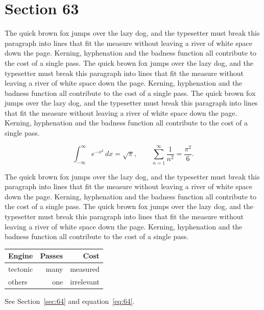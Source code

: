 \documentclass{article}
\begin{document}
\section{Section 63}
\label{sec:63}
The quick brown fox jumps over the lazy dog, and the typesetter must break this paragraph into lines that fit the measure without leaving a river of white space down the page. Kerning, hyphenation and the badness function all contribute to the cost of a single pass. The quick brown fox jumps over the lazy dog, and the typesetter must break this paragraph into lines that fit the measure without leaving a river of white space down the page. Kerning, hyphenation and the badness function all contribute to the cost of a single pass. The quick brown fox jumps over the lazy dog, and the typesetter must break this paragraph into lines that fit the measure without leaving a river of white space down the page. Kerning, hyphenation and the badness function all contribute to the cost of a single pass. 

\begin{equation}\label{eq:63}
\int_{-\infty}^{\infty} e^{-x^{2}}\,dx = \sqrt{\pi}, \qquad
\sum_{n=1}^{\infty} \frac{1}{n^{2}} = \frac{\pi^{2}}{6}.
\end{equation}

The quick brown fox jumps over the lazy dog, and the typesetter must break this paragraph into lines that fit the measure without leaving a river of white space down the page. Kerning, hyphenation and the badness function all contribute to the cost of a single pass. The quick brown fox jumps over the lazy dog, and the typesetter must break this paragraph into lines that fit the measure without leaving a river of white space down the page. Kerning, hyphenation and the badness function all contribute to the cost of a single pass. 

\begin{center}
\begin{tabular}{lrr}
\toprule
Engine & Passes & Cost \\
\midrule
tectonic & many & measured \\
others & one & irrelevant \\
\bottomrule
\end{tabular}
\end{center}

See Section~\ref{sec:64} and equation~\eqref{eq:64}.
\end{document}
